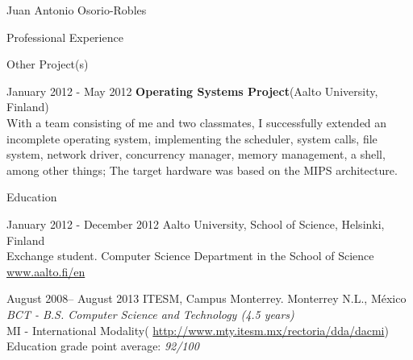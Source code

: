 \documentclass[english,10pt,letterpaper]{article}
\begin{document}
\begin{cv}{Juan Antonio Osorio-Robles}
\begin{cvlist}{Professional Experience}
	\end{cvlist}

    \begin{cvlist}{Other Project(s)}
		\item [January 2012 - May 2012]
            \textbf{Operating Systems Project}(Aalto University, Finland)\\
            With a team consisting of me and two classmates, I successfully
            extended an incomplete operating system, implementing the scheduler,
            system calls, file system, network driver, concurrency manager,
            memory management, a shell, among other things; The target hardware
            was based on the MIPS architecture.
	\end{cvlist}

	\begin{cvlist}{Education}
		\item [January 2012 - December 2012]
			Aalto University, School of Science, Helsinki, Finland\\
			Exchange student. Computer Science Department in the School of
            Science\\
			\href{www.aalto.fi/en}{www.aalto.fi/en}

		\item	[August 2008-- August 2013]
			ITESM, Campus Monterrey. Monterrey N.L., M\'{e}xico\\
			\emph{BCT - B.S. Computer Science and Technology (4.5 years)}\\
			MI - International Modality(
            \href{http://www.mty.itesm.mx/rectoria/dda/dacmi}
            {http://www.mty.itesm.mx/rectoria/dda/dacmi})\\
			Education grade point average: \emph{92/100}
	\end{cvlist}


\end{cv}
\end{document}
